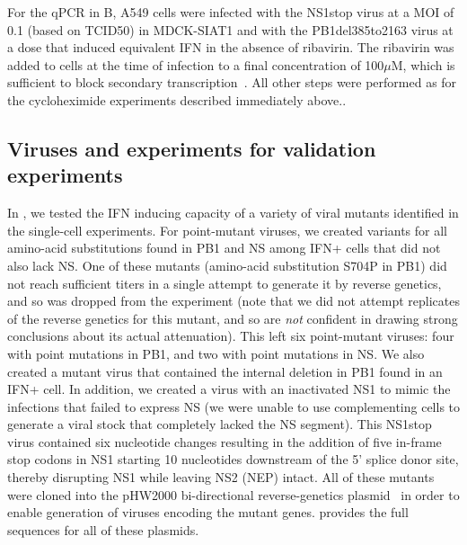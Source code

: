 \documentclass[9pt,lineno]{elife}
\begin{document}
For the qPCR in B, A549 cells were infected with the NS1stop virus at a MOI of 0.1 (based on TCID50) in MDCK-SIAT1 and with the PB1del385to2163 virus at a dose that induced equivalent IFN in the absence of ribavirin.
The ribavirin was added to cells at the time of infection to a final concentration of 100$\mu$M, which is sufficient to block secondary transcription~\citep{Vanderlinden:2016ec,Reuther:2015ef,Scholtissek:1976wg}.
All other steps were performed as for the cycloheximide experiments described immediately above..

\subsection{Viruses and experiments for validation experiments}
In , we tested the IFN inducing capacity of a variety of viral mutants identified in the single-cell experiments.
For point-mutant viruses, we created variants for all amino-acid substitutions found in PB1 and NS among IFN+ cells that did not also lack NS.
One of these mutants (amino-acid substitution S704P in PB1) did not reach sufficient titers in a single attempt to generate it by reverse genetics, and so was dropped from the experiment (note that we did not attempt replicates of the reverse genetics for this mutant, and so are \emph{not} confident in drawing strong conclusions about its actual attenuation).
This left six point-mutant viruses: four with point mutations in PB1, and two with point mutations in NS.
We also created a mutant virus that contained the internal deletion in PB1 found in an IFN+ cell.
In addition, we created a virus with an inactivated NS1 to mimic the infections that failed to express NS (we were unable to use complementing cells to generate a viral stock that completely lacked the NS segment).
This NS1stop virus contained six nucleotide changes resulting in the addition of five in-frame stop codons in NS1 starting 10 nucleotides downstream of the 5' splice donor site, thereby disrupting NS1 while leaving NS2 (NEP) intact.
All of these mutants were cloned into the pHW2000 bi-directional reverse-genetics plasmid~\citep{hoffmann2000dna} in order to enable generation of viruses encoding the mutant genes.
  provides the full sequences for all of these plasmids.
\end{document}
